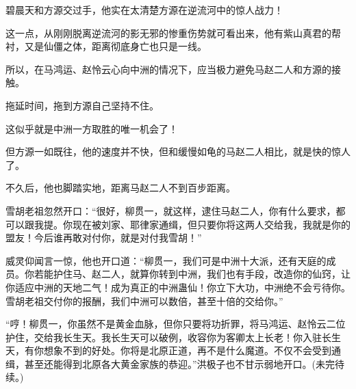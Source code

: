 \begin{this_body}
碧晨天和方源交过手，他实在太清楚方源在逆流河中的惊人战力！

这一点，从刚刚脱离逆流河的影无邪的惨重伤势就可看出来，他有紫山真君的帮衬，又是仙僵之体，距离彻底身亡也只是一线。

所以，在马鸿运、赵怜云心向中洲的情况下，应当极力避免马赵二人和方源的接触。

拖延时间，拖到方源自己坚持不住。

这似乎就是中洲一方取胜的唯一机会了！

但方源一如既往，他的速度并不快，但和缓慢如龟的马赵二人相比，就是快的惊人了。

不久后，他也脚踏实地，距离马赵二人不到百步距离。

雪胡老祖忽然开口：“很好，柳贯一，就这样，逮住马赵二人，你有什么要求，都可以跟我提。你现在被刘家、耶律家通缉，但只要你将这两人交给我，我就是你的盟友！今后谁再敢对付你，就是对付我雪胡！”

威灵仰闻言一惊，他也开口道：“柳贯一，我们可是中洲十大派，还有天庭的成员。你若能护住马、赵二人，就算你转到中洲，我们也有手段，改造你的仙窍，让你适应中洲的天地二气！成为真正的中洲蛊仙！你立下大功，中洲绝不会亏待你。雪胡老祖交付你的报酬，我们中洲可以数倍，甚至十倍的交给你。”

“哼！柳贯一，你虽然不是黄金血脉，但你只要将功折罪，将马鸿运、赵怜云二位护住，交给我长生天。我长生天可以破例，收容你为客卿太上长老！你入驻长生天，有你想象不到的好处。你将是北原正道，再不是什么魔道。不仅不会受到通缉，甚至还能得到北原各大黄金家族的恭迎。”洪极子也不甘示弱地开口。(未完待续。)

\end{this_body}

